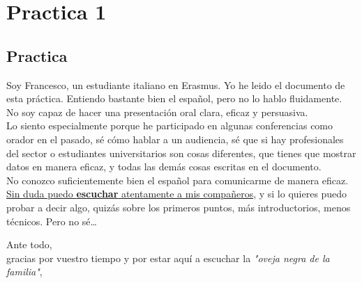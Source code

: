 \chapter{Practica 1}
\section{Practica}

Soy Francesco, un estudiante italiano en Erasmus. Yo he leido el documento de esta práctica. Entiendo bastante bien el español, pero no lo hablo fluidamente.\\
No soy capaz de hacer una presentación oral clara, eficaz y persuasiva.\\
Lo siento especialmente porque he participado en algunas conferencias como orador en el pasado, sé cómo hablar a un audiencia, sé que si hay profesionales del sector o estudiantes universitarios son cosas diferentes, que tienes que mostrar datos en manera eficaz, y todas las demás cosas escritas en el documento.\\
No conozco suficientemente bien el español para comunicarme de manera eficaz.\\
\ul{Sin duda puedo \textbf{escuchar} atentamente a mis compañeros}, y si lo quieres puedo probar a decir algo, quizás sobre los primeros puntos, más introductorios, menos técnicos. Pero no sé\dots
\nl
\nl


Ante todo,\\
gracias por vuestro tiempo y por estar aquí a escuchar la \textit{"oveja negra de la familia"},

